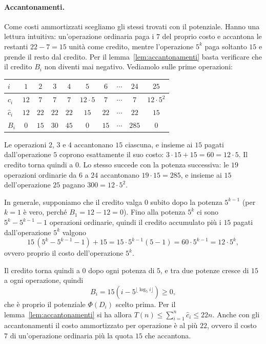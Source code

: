 \paragraph{Accantonamenti.}
Come costi ammortizzati scegliamo gli stessi trovati con il potenziale. Hanno una lettura intuitiva: un'operazione ordinaria paga i $7$ del proprio costo e accantona le restanti $22 - 7 = 15$ unità come credito, mentre l'operazione $5^k$ paga soltanto $15$ e prende il resto dal credito. Per il lemma~\ref{lem:accantonamenti} basta verificare che il credito $B_i$ non diventi mai negativo. Vediamolo sulle prime operazioni:
\begin{center}
\small
\begin{tabular}{lccccccccc}
\toprule
$i$ & $1$ & $2$ & $3$ & $4$ & $5$ & $6$ & $\cdots$ & $24$ & $25$ \\
\midrule
$c_i$ & $12$ & $7$ & $7$ & $7$ & $12 \cdot 5$ & $7$ & $\cdots$ & $7$ & $12 \cdot 5^2$ \\
$\hat{c}_i$ & $12$ & $22$ & $22$ & $22$ & $15$ & $22$ & $\cdots$ & $22$ & $15$ \\
$B_i$ & $0$ & $15$ & $30$ & $45$ & $0$ & $15$ & $\cdots$ & $285$ & $0$ \\
\bottomrule
\end{tabular}
\end{center}
Le operazioni $2$, $3$ e $4$ accantonano $15$ ciascuna, e insieme ai $15$ pagati dall'operazione $5$ coprono esattamente il suo costo: $3 \cdot 15 + 15 = 60 = 12 \cdot 5$. Il credito torna quindi a $0$. Lo stesso succede con la potenza successiva: le $19$ operazioni ordinarie da $6$ a $24$ accantonano $19 \cdot 15 = 285$, e insieme ai $15$ dell'operazione $25$ pagano $300 = 12 \cdot 5^2$.

In generale, supponiamo che il credito valga $0$ subito dopo la potenza $5^{k-1}$ (per $k = 1$ è vero, perché $B_1 = 12 - 12 = 0$). Fino alla potenza $5^k$ ci sono $5^k - 5^{k-1} - 1$ operazioni ordinarie, quindi il credito accumulato più i $15$ pagati dall'operazione $5^k$ valgono
\[
15\,(5^k - 5^{k-1} - 1) + 15 = 15 \cdot 5^{k-1}(5 - 1) = 60 \cdot 5^{k-1} = 12 \cdot 5^k,
\]
ovvero proprio il costo dell'operazione $5^k$.

Il credito torna quindi a $0$ dopo ogni potenza di $5$, e tra due potenze cresce di $15$ a ogni operazione, quindi
\[
B_i = 15\left(i - 5^{\lfloor \log_5 i \rfloor}\right) \ge 0,
\]
che è proprio il potenziale $\Phi(D_i)$ scelto prima. Per il lemma~\ref{lem:accantonamenti} si ha allora $T(n) \le \sum_{i=1}^{n} \hat{c}_i \le 22n$. Anche con gli accantonamenti il costo ammortizzato per operazione è al più $22$, ovvero il costo $7$ di un'operazione ordinaria più la quota $15$ che accantona.

